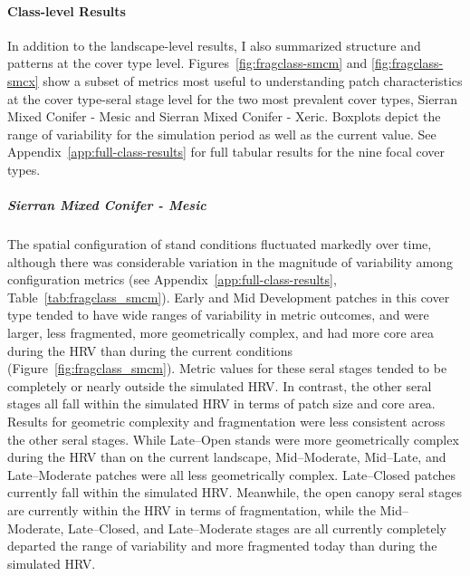 



\clearpage


\paragraph*{Class-level Results}

In addition to the landscape-level results, I also summarized structure and patterns at the cover type level. Figures~\ref{fig:fragclass-smcm} and \ref{fig:fragclass-smcx} show a subset of metrics most useful to understanding patch characteristics at the cover type-seral stage level for the two most prevalent cover types, Sierran Mixed Conifer - Mesic and Sierran Mixed Conifer - Xeric. Boxplots depict the range of variability for the simulation period as well as the current value. See Appendix~\ref{app:full-class-results} for full tabular results for the nine focal cover types.


\subparagraph*{Sierran Mixed Conifer - Mesic} %
The spatial configuration of stand conditions fluctuated markedly over time, although there was considerable variation in the magnitude of variability among configuration metrics (see Appendix~\ref{app:full-class-results}, Table~\ref{tab:fragclass_smcm}). Early and Mid Development patches in this cover type tended to have wide ranges of variability in metric outcomes, and were larger, less fragmented, more geometrically complex, and had more core area during the HRV than during the current conditions (Figure~\ref{fig:fragclass_smcm}). Metric values for these seral stages tended to be completely or nearly outside the simulated HRV. 
In contrast, the other seral stages all fall within the simulated HRV in terms of patch size and core area. Results for geometric complexity and fragmentation were less consistent across the other seral stages. While Late--Open stands were more geometrically complex during the HRV than on the current landscape, Mid--Moderate, Mid--Late, and Late--Moderate patches were all less geometrically complex. Late--Closed patches currently fall within the simulated HRV. Meanwhile, the open canopy seral stages are currently within the HRV in terms of fragmentation, while the Mid--Moderate, Late--Closed, and Late--Moderate stages are all currently completely departed the range of variability and more fragmented today than during the simulated HRV.  

